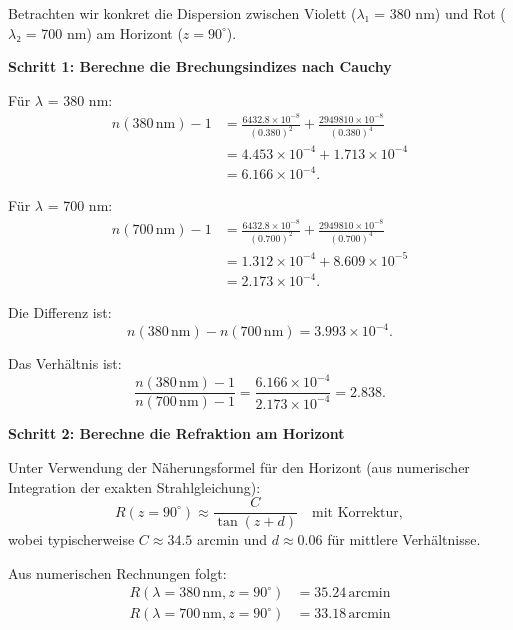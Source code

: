 \documentclass[12pt,a4paper]{article}
\begin{document}
Betrachten wir konkret die Dispersion zwischen Violett ($\lambda$₁ = 380 nm) und Rot ($\lambda$₂ = 700 nm)
am Horizont ($z = 90^\circ$).

\textbf{Schritt 1: Berechne die Brechungsindizes nach Cauchy}

Für $\lambda$ = 380 nm:
\begin{equation}
  \begin{aligned}
  n(380\,\mathrm{nm}) - 1
  &= \frac{6432.8 \times 10^{-8}}{(0.380)^2}
   + \frac{2949810 \times 10^{-8}}{(0.380)^4} \\
  &= 4.453 \times 10^{-4} + 1.713 \times 10^{-4} \\
  &= 6.166 \times 10^{-4}.
  \end{aligned}
	\label{eq:n_380}
\end{equation}

Für $\lambda$ = 700 nm:
\begin{equation}
  \begin{aligned}
  n(700\,\mathrm{nm}) - 1
  &= \frac{6432.8 \times 10^{-8}}{(0.700)^2}
   + \frac{2949810 \times 10^{-8}}{(0.700)^4} \\
  &= 1.312 \times 10^{-4} + 8.609 \times 10^{-5} \\
  &= 2.173 \times 10^{-4}.
  \end{aligned}
	\label{eq:n_700}
\end{equation}

Die Differenz ist:
\begin{equation}
	n(380\,\mathrm{nm}) - n(700\,\mathrm{nm}) = 3.993 \times 10^{-4}.
	\label{eq:delta_n}
\end{equation}

Das Verhältnis ist:
\begin{equation}
	\frac{n(380\,\mathrm{nm}) - 1}{n(700\,\mathrm{nm}) - 1} = \frac{6.166 \times 10^{-4}}{2.173 \times 10^{-4}} = 2.838.
	\label{eq:n_ratio}
\end{equation}

\textbf{Schritt 2: Berechne die Refraktion am Horizont}

Unter Verwendung der Näherungsformel für den Horizont (aus numerischer Integration
der exakten Strahlgleichung):
\begin{equation}
  R(z=90^\circ) \approx \frac{C}{\tan(z + d)} \quad \text{mit Korrektur},
	\label{eq:refr_horizont_approx}
\end{equation}
wobei typischerweise $C \approx 34.5$ arcmin und $d \approx 0.06$ für mittlere Verhältnisse.

Aus numerischen Rechnungen folgt:
\begin{equation}
  \begin{aligned}
    R(\lambda = 380\,\mathrm{nm}, z=90^\circ) &= 35.24\,\text{arcmin}\\
    R(\lambda = 700\,\mathrm{nm}, z=90^\circ) &= 33.18\,\text{arcmin}
	\end{aligned}
	\label{eq:R_concrete}
\end{equation}
\end{document}
